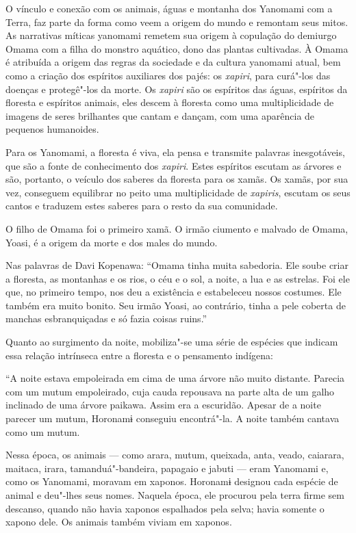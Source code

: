 \documentclass[12pt]{extarticle}
\begin{document}
{O vínculo e conexão com os animais, águas e montanha dos Yanomami com a 
Terra, faz parte da forma como veem a origem do mundo e remontam seus mitos. 
As narrativas míticas yanomami remetem sua origem à copulação do demiurgo 
Omama com a filha do monstro aquático, dono das plantas cultivadas. À Omama
é atribuída a origem das regras da sociedade e da cultura yanomami atual,
bem como a criação dos espíritos auxiliares dos pajés: os \emph{xapiri}, 
para curá"-los das doenças e protegê"-los da morte. Os \emph{xapiri} são os 
espíritos das águas, espíritos da floresta e espíritos animais, eles descem 
à floresta como uma multiplicidade de imagens de seres brilhantes que cantam 
e dançam, com uma aparência de pequenos humanoides.

Para os Yanomami, a floresta é viva, ela pensa e transmite palavras inesgotáveis,
que são a fonte de conhecimento dos \emph{xapiri}. Estes espíritos escutam as 
árvores e são, portanto, o veículo dos saberes da floresta para os xamãs. Os xamãs,
por sua vez, conseguem equilibrar no peito uma multiplicidade de \emph{xapiris}, 
escutam os seus cantos e traduzem estes saberes para o resto da sua comunidade.

O filho de Omama foi o primeiro xamã. O irmão ciumento e malvado de Omama,
Yoasi, é a origem da morte e dos males do mundo.

Nas palavras de Davi Kopenawa: ``Omama  tinha muita sabedoria. Ele soube criar a 
floresta, as montanhas e os rios, o céu e o sol, a noite, a lua e as estrelas. 
Foi ele que, no primeiro tempo, nos deu a existência e estabeleceu nossos costumes. 
Ele também era muito bonito. Seu irmão Yoasi, ao contrário, tinha a pele coberta de 
manchas esbranquiçadas e só fazia coisas ruins.''

Quanto ao surgimento da noite, mobiliza"-se uma série de espécies que indicam essa 
relação intrínseca entre a floresta e o pensamento indígena: 

``A noite estava empoleirada em cima de uma árvore não muito distante. Parecia com 
um mutum empoleirado, cuja cauda repousava na parte alta de um galho inclinado de 
uma árvore paikawa. Assim era a escuridão. Apesar de a noite parecer um mutum, 
Horonamɨ conseguiu encontrá"-la. A noite também cantava como um mutum.

Nessa época, os animais — como arara, mutum, queixada, anta, veado, caiarara, maitaca, 
irara, tamanduá"-bandeira, papagaio e jabuti — eram Yanomami e, como os Yanomami, moravam 
em xaponos. Horonamɨ designou cada espécie de animal e deu"-lhes seus nomes. Naquela época, 
ele procurou pela terra firme sem descanso, quando não havia xaponos espalhados pela selva; 
havia somente o xapono dele. Os animais também viviam em xaponos.

}
\end{document}
